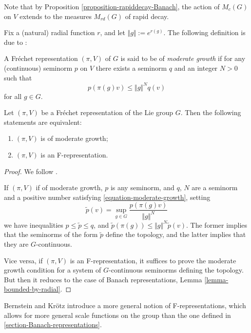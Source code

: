 Note that by Proposition \ref{proposition-rapiddecay-Banach}, the action of $M_c(G)$ on $V$ extends to the measures $M_{rd}(G)$ of rapid decay. 

Fix a (natural) radial function $r$, and let $\Vert g\Vert:= e^{r(g)}$. The following definition is due to \cite{Casselman-canonicalextensions}:

\begin{definition}
\label{definition-moderate-growth}
A Fr\'echet representation $(\pi,V)$ of $G$ is said to be of {\it moderate
growth} if for any (continuous) seminorm $p$ on $V$ there exists a seminorm $q$
and an integer $N > 0$ such that
\begin{equation}
\label{equation-moderate-growth}
p(\pi(g)v) \le \Vert g\Vert^N q(v)
\end{equation}
for all $g \in G$.
\end{definition}

\begin{lemma}
\label{lemma-F-moderate-growth} 
 Let $(\pi, V)$ be a Fr\'echet representation of the Lie group
$G$. Then the following statements are equivalent:
\begin{enumerate}
 \item  $(\pi,V)$ is of moderate growth;
 \item $(\pi, V)$ is an F-representation.
\end{enumerate}
\end{lemma}

\begin{proof}
We follow \cite[Lemma 2.10]{Bernstein-Kroetz}.

If $(\pi, V)$ if of moderate growth, $p$ is any seminorm, and $q$, $N$ are a seminorm and a positive number satisfying \eqref{equation-moderate-growth}, setting 
$$ \tilde p (v) = \sup_{g\in G} \frac{p(\pi(g)v)}{\Vert g\Vert^N}$$ 
we have inequalities $p\le \tilde p\le q$, and $\tilde p(\pi(g)) \le \Vert g\Vert^N \tilde p(v)$. The former implies that the seminorms of the form $\tilde p$ define the topology, and the latter implies that they are $G$-continuous.

Vice versa, if $(\pi, V)$ is an F-representation, it suffices to prove the moderate growth condition for a system of $G$-continuous seminorms defining the topology. But then it reduces to the case of Banach representations, Lemma \ref{lemma-bounded-by-radial}. 
\end{proof}

\begin{remark}
\label{remark-generalscalefunctions}
 Bernstein and Kr\"otz introduce a more general notion of F-representations, which allows for more general scale functions on the group than the one defined in \ref{section-Banach-representations}.
\end{remark}


